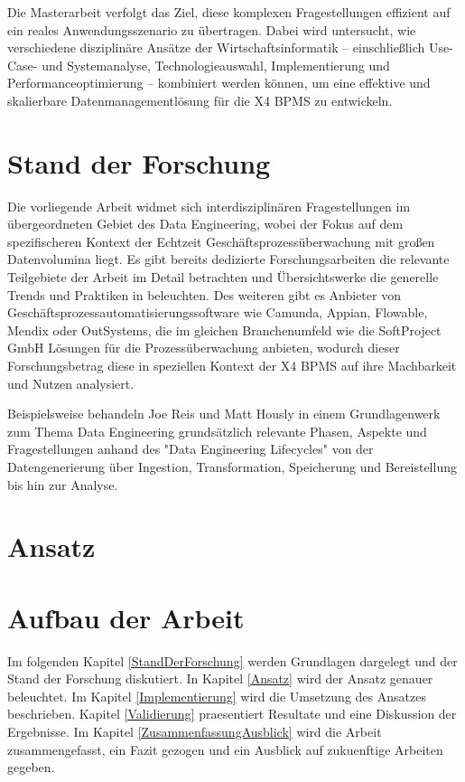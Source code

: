 Die Masterarbeit verfolgt das Ziel, diese komplexen Fragestellungen effizient auf ein reales Anwendungsszenario zu übertragen. Dabei wird untersucht, wie verschiedene disziplinäre Ansätze der Wirtschaftsinformatik – einschließlich Use-Case- und Systemanalyse, Technologieauswahl, Implementierung und Performanceoptimierung – kombiniert werden können, um eine effektive und skalierbare Datenmanagementlösung für die X4 BPMS zu entwickeln.

\section{Stand der Forschung}

Die vorliegende Arbeit widmet sich interdisziplinären Fragestellungen im übergeordneten Gebiet des Data Engineering, wobei der Fokus auf dem spezifischeren Kontext der Echtzeit Geschäftsprozessüberwachung mit großen Datenvolumina liegt. Es gibt bereits dedizierte Forschungsarbeiten die relevante Teilgebiete der Arbeit im Detail betrachten und Übersichtswerke die generelle Trends und Praktiken in beleuchten. Des weiteren gibt es Anbieter von Geschäftsprozessautomatisierungssoftware wie Camunda, Appian, Flowable, Mendix oder OutSystems, die im gleichen Branchenumfeld wie die SoftProject GmbH Lösungen für die Prozessüberwachung anbieten, wodurch dieser Forschungsbetrag diese in speziellen Kontext der X4 BPMS auf ihre Machbarkeit und Nutzen analysiert. 

\cite{CamundaOperate}

Beispielsweise behandeln Joe Reis und Matt Hously in einem Grundlagenwerk zum Thema Data Engineering grundsätzlich relevante Phasen, Aspekte und Fragestellungen anhand des "Data Engineering Lifecycles" von der Datengenerierung über Ingestion, Transformation, Speicherung und Bereistellung bis hin zur Analyse. \cite{reis2023} 

\section{Ansatz}

\section{Aufbau der Arbeit}
Im folgenden Kapitel \ref{StandDerForschung} werden Grundlagen
dargelegt und der Stand der Forschung diskutiert. In Kapitel
\ref{Ansatz} wird der Ansatz genauer beleuchtet. Im Kapitel
\ref{Implementierung} wird die Umsetzung des Ansatzes
beschrieben. Kapitel \ref{Validierung} praesentiert Resultate und eine
Diskussion der Ergebnisse. Im Kapitel \ref{ZusammenfassungAusblick}
wird die Arbeit zusammengefasst, ein Fazit gezogen und ein Ausblick
auf zukuenftige Arbeiten gegeben.

 
